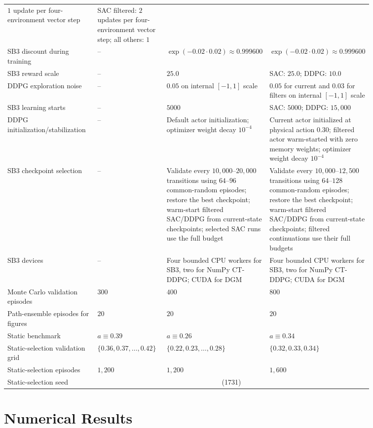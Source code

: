 \documentclass[11pt]{article}
\newcommand{\NA}{--}
\begin{document}
\begin{longtable}{p{0.26\linewidth}p{0.20\linewidth}p{0.20\linewidth}p{0.20\linewidth}}
\(1\) update per four-environment vector step &
SAC filtered: \(2\) updates per four-environment vector step; all others: \(1\) \\
SB3 discount during training &
\NA &
\(\exp(-0.02\cdot0.02)\approx0.999600\) &
\(\exp(-0.02\cdot0.02)\approx0.999600\) \\
SB3 reward scale &
\NA &
\(25.0\) &
SAC: \(25.0\); DDPG: \(10.0\) \\
DDPG exploration noise &
\NA &
\(0.05\) on internal \([-1,1]\) scale &
\(0.05\) for current and \(0.03\) for filters on internal \([-1,1]\) scale \\
SB3 learning starts &
\NA &
\(5000\) &
SAC: \(5000\); DDPG: \(15{,}000\) \\
DDPG initialization/stabilization &
\NA &
Default actor initialization; optimizer weight decay \(10^{-4}\) &
Current actor initialized at physical action \(0.30\); filtered actor warm-started with zero memory weights; optimizer weight decay \(10^{-4}\) \\
SB3 checkpoint selection &
\NA &
Validate every \(10{,}000\)--\(20{,}000\) transitions using \(64\)--\(96\) common-random episodes; restore the best checkpoint; warm-start filtered SAC/DDPG from current-state checkpoints; selected SAC runs use the full budget &
Validate every \(10{,}000\)--\(12{,}500\) transitions using \(64\)--\(128\) common-random episodes; restore the best checkpoint; warm-start filtered SAC/DDPG from current-state checkpoints; filtered continuations use their full budgets \\
SB3 devices &
\NA &
Four bounded CPU workers for SB3, two for NumPy CT-DDPG; CUDA for DGM &
Four bounded CPU workers for SB3, two for NumPy CT-DDPG; CUDA for DGM \\
Monte Carlo validation episodes &
\(300\) &
\(400\) &
\(800\) \\
Path-ensemble episodes for figures &
\(20\) &
\(20\) &
\(20\) \\
Static benchmark &
\(a\equiv0.39\) &
\(a\equiv0.26\) &
\(a\equiv0.34\) \\
Static-selection validation grid &
\(\{0.36,0.37,\ldots,0.42\}\) &
\(\{0.22,0.23,\ldots,0.28\}\) &
\(\{0.32,0.33,0.34\}\) \\
Static-selection episodes &
\(1{,}200\) &
\(1{,}200\) &
\(1{,}600\) \\
Static-selection seed &
\multicolumn{3}{c}{(1731)} \\
\end{longtable}

\section{Numerical Results}
\end{document}
